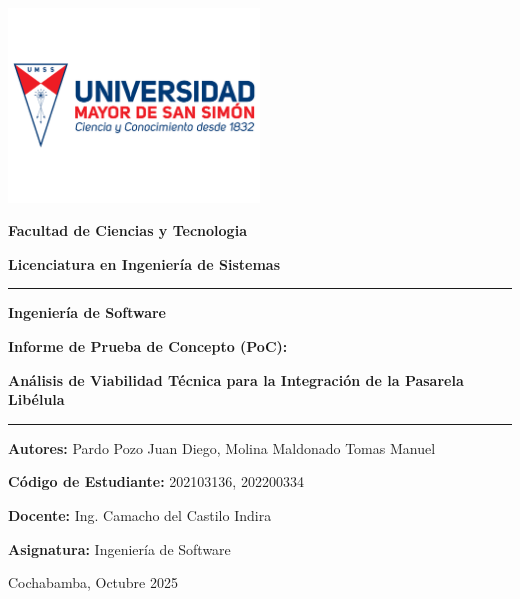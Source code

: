 \begin{titlepage}
    \thispagestyle{empty}
    \begin{center}
        \vspace*{-3cm}
        
        \includegraphics[width=0.5\textwidth]{resources/images/logos/logoUMSS.png} 

        \normalsize{
            \textbf{Facultad de Ciencias y Tecnologia}\par
            \textbf{Licenciatura en Ingeniería de Sistemas}\par
        }

        \vspace*{2cm}
        \rule{\textwidth}{0.2pt}\par

        \vspace*{0.5cm}
        \Huge{
            \textbf{Ingeniería de Software}\par
        }
        \Large{
            \textbf{Informe de Prueba de Concepto (PoC):}\par
            \textbf{Análisis de Viabilidad Técnica para la Integración de la Pasarela Libélula}\par
        }   
        \vspace*{0.5cm} 

        \rule{\textwidth}{0.2pt}\par
        \vspace*{2cm}

        \normalsize{
            \textbf{Autores: }Pardo Pozo Juan Diego, Molina Maldonado Tomas Manuel\par
            \textbf{Código de Estudiante: } 202103136, 202200334\par
            \textbf{Docente: }Ing. Camacho del Castilo Indira\par
            \textbf{Asignatura: }Ingeniería de Software\par
        }

        \vfill

        \normalsize{
            Cochabamba, Octubre 2025
        }
    \end{center}
\end{titlepage}